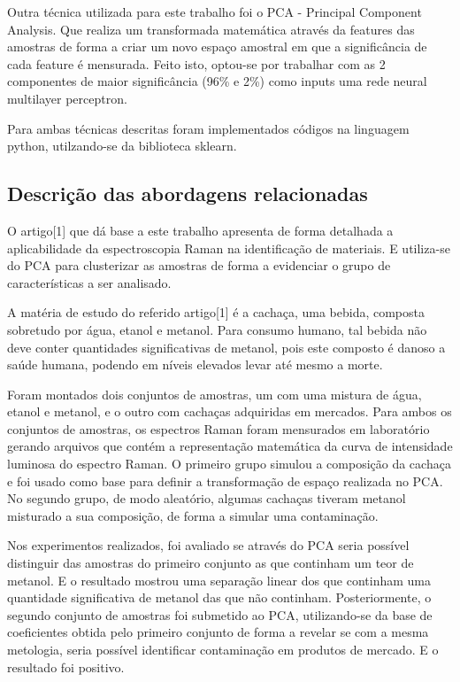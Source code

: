 \documentclass{article}
\begin{document}
Outra técnica utilizada para este trabalho foi o PCA - Principal Component Analysis. Que realiza um transformada matemática através da features das amostras de forma a criar um novo espaço amostral em que a significância de cada feature é mensurada. Feito isto, optou-se por trabalhar com as 2 componentes de maior significância (96\% e 2\%) como inputs uma rede neural multilayer perceptron.

Para ambas técnicas descritas foram implementados códigos na linguagem python, utilzando-se da biblioteca sklearn.

\subsection{Descrição das abordagens relacionadas}
\vspace{1cm} O artigo[1] que dá base a este trabalho apresenta de forma detalhada a aplicabilidade da espectroscopia Raman na identificação de materiais. E utiliza-se do PCA para clusterizar as amostras de forma a evidenciar o grupo de características a ser analisado.

A matéria de estudo do referido artigo[1] é a cachaça, uma bebida, composta sobretudo por água, etanol e metanol. Para consumo humano, tal bebida não deve conter quantidades significativas de metanol, pois este composto é danoso a saúde humana, podendo em níveis elevados levar até mesmo a morte.

Foram montados dois conjuntos de amostras, um com uma mistura de água, etanol e metanol, e o outro com cachaças adquiridas em mercados. Para ambos os conjuntos de amostras, os espectros Raman foram mensurados em laboratório gerando arquivos que contém a representação matemática da curva de intensidade luminosa do espectro Raman. O primeiro grupo simulou a composição da cachaça e foi usado como base para definir a transformação de espaço realizada no PCA. No segundo grupo, de modo aleatório, algumas cachaças tiveram metanol misturado a sua composição, de forma a simular uma contaminação.

Nos experimentos realizados, foi avaliado se através do PCA seria possível distinguir das amostras do primeiro conjunto as que continham um teor de metanol. E o resultado mostrou uma separação linear dos que continham uma quantidade significativa de metanol das que não continham. Posteriormente, o segundo conjunto de amostras foi submetido ao PCA, utilizando-se da base de coeficientes obtida pelo primeiro conjunto de forma a revelar se com a mesma metologia, seria possível identificar contaminação em produtos de mercado. E o resultado foi positivo.
\end{document}
